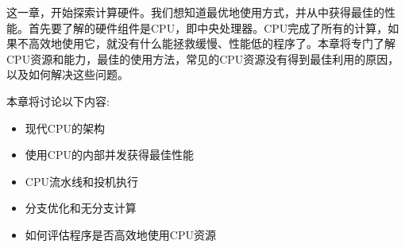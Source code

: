 这一章，开始探索计算硬件。我们想知道最优地使用方式，并从中获得最佳的性能。首先要了解的硬件组件是CPU，即中央处理器。CPU完成了所有的计算，如果不高效地使用它，就没有什么能拯救缓慢、性能低的程序了。本章将专门了解CPU资源和能力，最佳的使用方法，常见的CPU资源没有得到最佳利用的原因，以及如何解决这些问题。

本章将讨论以下内容:

\begin{itemize}
\item 现代CPU的架构
\item 使用CPU的内部并发获得最佳性能
\item CPU流水线和投机执行
\item 分支优化和无分支计算
\item 如何评估程序是否高效地使用CPU资源
\end{itemize}